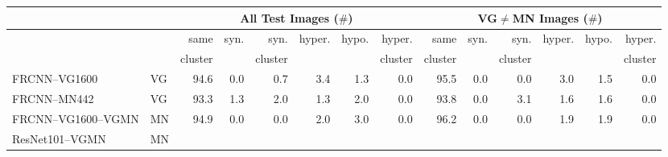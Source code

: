 \begin{table}[t]
	\centering
	\small
	\begin{tabular}{llr@{~}|r@{~}r@{~}r@{~}r@{~}r@{~}||r@{~}|r@{~}r@{~}r@{~}r@{~}r@{~}}
		\toprule
		& & \multicolumn{6}{c}{All Test Images ($\#$)} 
		& \multicolumn{6}{c}{VG$\neq$MN Images ($\#$)}\\
		\toprule
		& &  same &  syn. &  syn. &  hyper. &  hypo. &  hyper. &  same &  syn. &  syn. &  hyper. &  hypo. &  hyper. \\
		& 	&  cluster &  & cluster & & & cluster 
		& cluster  &  & cluster & & & cluster \\
		\midrule
		FRCNN--VG1600 & VG     %
		&                  94.6 &              0.0 &                 0.7 &               3.4 &              1.3 &                  0.0 &                  95.5 &              0.0 &                 0.0 &               3.0 &              1.5 &                  0.0 \\
		FRCNN--MN442 & VG %
		&                  93.3 &              1.3 &                 2.0 &               1.3 &              2.0 &                  0.0 &                  93.8 &              0.0 &                 3.1 &               1.6 &              1.6 &                  0.0 \\
		\midrule \midrule
		FRCNN--VG1600--VGMN & MN %
		&                  94.9 &              0.0 &                 0.0 &               2.0 &              3.0 &                  0.0 &                  96.2 &              0.0 &                 0.0 &               1.9 &              1.9 &                  0.0 \\
		\midrule
		ResNet101--VGMN & MN %

\end{tabular}
\end{table}
